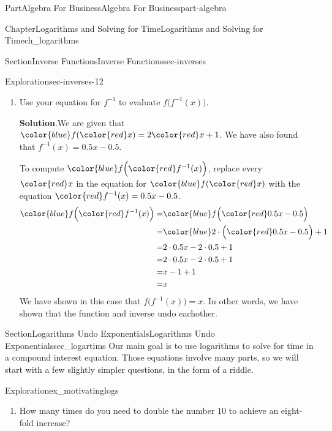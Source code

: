 \documentclass{tufte-book}
\newcommand{\blocktitlefont}{\relax}
\numberwithin{equation}{chapter}
\newcommand{\amp}{&}
\begin{document}
\begin{partptx}{Part}{Algebra For Business}{}{Algebra For Business}{}{}{part-algebra}
\begin{chapterptx}{Chapter}{Logarithms and Solving for Time}{}{Logarithms and Solving for Time}{}{}{ch_logarithms}
\begin{sectionptx}{Section}{Inverse Functions}{}{Inverse Functions}{}{}{sec-inverses}
\begin{exploration}{Exploration}{}{sec-inverses-12}
\begin{enumerate}[font=\bfseries,label=(\alph*),ref=\alph*]
The equation for our inverse is%
\begin{equation*}
f^{-1}(x) = 0.5 x -0.5
\end{equation*}
%
\item{}Use your equation for \(f^{-1}\) to evaluate \(f\Big(f^{-1}(x)\Big)\).%
\par\smallskip%
\noindent\textbf{\blocktitlefont Solution}.\hypertarget{sec-inverses-12-3-2}{}\quad{}We are given that \(\color{blue} f({\color{red} x}) = 2{\color{red} x} + 1\).  We have also found that \(f^{-1}(x) = 0.5x - 0.5\).%
\par
To compute \({ \color{blue} f\Big({\color{red} f^{-1}(x)}\Big) }\), replace every \(\color{red} x\) in the equation for \(\color{blue} f({\color{red} x}) \) with the equation \(\color{red} f^{-1}(x) = 0.5x - 0.5\).%
\begin{align*}
{ \color{blue} f\Big({\color{red} f^{-1}(x)}\Big) }= \amp {\color{blue} f\Big( { \color{red} 0.5x - 0.5}\Big)}\\
= \amp {\color{blue}  2\cdot \Big({ \color{red} 0.5x - 0.5}\Big) + 1}\\
= \amp 2\cdot 0.5x - 2\cdot 0.5 + 1\\
= \amp 2\cdot 0.5x - 2\cdot 0.5 + 1\\
= \amp x - 1 + 1\\
= \amp x
\end{align*}
We have shown in this case that \(f\Big(f^{-1}(x)\Big)=x\). In other words, we have shown that the function and inverse undo eachother.%
\end{enumerate}%
\end{exploration}%
\end{sectionptx}
%
%
\typeout{************************************************}
\typeout{************************************************}
%
\begin{sectionptx}{Section}{Logarithms Undo Exponentials}{}{Logarithms Undo Exponentials}{}{}{sec_logartims}
Our main goal is to use logarithms to solve for time in a compound interest equation. Those equations involve many parts, so we will start with a few slightly simpler questions, in the form of a riddle.%
\begin{exploration}{Exploration}{}{ex_motivatinglogs}%
\begin{enumerate}[font=\bfseries,label=(\alph*),ref=\alph*]%
\item{}How many times do you need to double the number \(10\) to achieve an eight-fold increase?%
\par\smallskip%

\end{enumerate}
\end{exploration}
\end{sectionptx}
\end{chapterptx}
\end{partptx}
\end{document}
